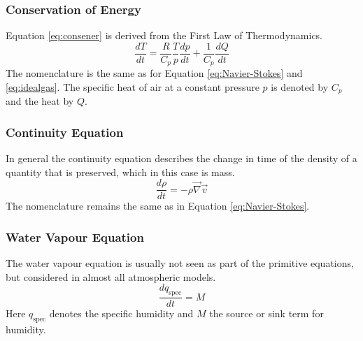 \subsubsection{Conservation of Energy}
   Equation \eqref{eq:consener} is derived from the First Law of Thermodynamics. 
    \begin{equation}
        \frac{dT}{dt} = \frac{R}{C_{p}} \frac{T}{p} \frac{dp}{dt} + \frac{1}{C_{p} }\frac{dQ}{dt}
    \label{eq:consener}
    \end{equation}
   The nomenclature is the same as for Equation \eqref{eq:Navier-Stokes} and \eqref{eq:idealgas}. The specific heat of air at a constant pressure $p$ is denoted by $C_{p}$ and the heat by $Q$.

\subsubsection{Continuity Equation}
In general the continuity equation describes the change in time of the density of a quantity that is preserved, which in this case is mass.
    \begin{equation}
        \frac{d \rho}{ dt} = - \rho \vec{\nabla} \vec{v}
    \label{eq:continuity}    
    \end{equation}
The nomenclature remains the same as in Equation \eqref{eq:Navier-Stokes}.
\subsubsection{Water Vapour Equation}
The water vapour equation is usually not seen as part of the primitive equations, but considered in almost all atmospheric models.
    \begin{equation}
        \frac{dq_{\mathrm{spec}}}{dt} = M 
    \label{eq:consvap}    
    \end{equation}
Here $q_{\mathrm{spec}}$ denotes the specific humidity and $M$ the source or sink term for humidity. 

